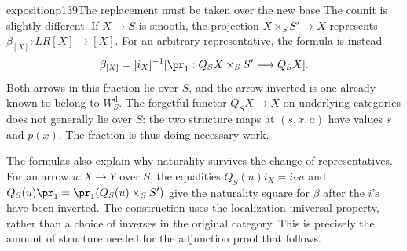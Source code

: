 \begin{dcomment}{exposition}{p139}{The replacement must be taken over the new base}
The counit is slightly different. If $X\longrightarrow S$ is smooth, the projection $X\times_SS'\longrightarrow X$ represents $\beta_{[X]}:LR[X]\longrightarrow[X]$. For an arbitrary representative, the formula is instead
\[
 \beta_{[X]}=[i_X]^{-1}
 [\pr_1:Q_SX\times_SS'\longrightarrow Q_SX].
\]
Both arrows in this fraction lie over $S$, and the arrow inverted is one already known to belong to $W_S^{\mathrm d}$. The forgetful functor $Q_SX\longrightarrow X$ on underlying categories does not generally lie over $S$: the two structure maps at $(s,x,a)$ have values $s$ and $p(x)$. The fraction is thus doing necessary work.

The formulas also explain why naturality survives the change of representatives. For an arrow $u:X\longrightarrow Y$ over $S$, the equalities $Q_S(u)i_X=i_Yu$ and $Q_S(u)\pr_1=\pr_1(Q_S(u)\times_SS')$ give the naturality square for $\beta$ after the $i$'s have been inverted. The construction uses the localization universal property, rather than a choice of inverses in the original category. This is precisely the amount of structure needed for the adjunction proof that follows.
\end{dcomment}

